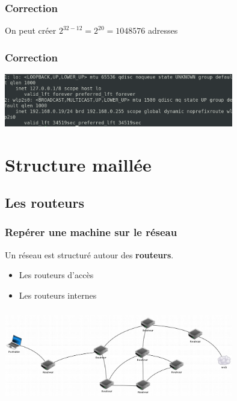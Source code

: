 \documentclass[svgnames,11pt]{beamer}
\begin{document}
\begin{frame}
    \frametitle{Correction}

    On peut créer $2^{32-12}=2^{20} = 1048576$ adresses

\end{frame}
\begin{frame}
    \frametitle{Correction}

    \begin{center}
        \centering
        \includegraphics[width=10cm]{ressources/ip.png}
        \label{IMG}
    \end{center}
\end{frame}
\section{Structure maillée}
\subsection{Les routeurs}
\begin{frame}
    \frametitle{Repérer une machine sur le réseau}

    Un réseau est structuré autour des \textbf{routeurs}.
\begin{itemize}
    \item<1-> Les routeurs d'accès
    \item<2-> Les routeurs internes
\end{itemize}

\end{frame}

\begin{frame}
    \frametitle{}

    \begin{center}
        \centering
        \includegraphics[width=10cm]{ressources/reseau.png}
        \label{reseau}
    \end{center}

\end{frame}
\end{document}
